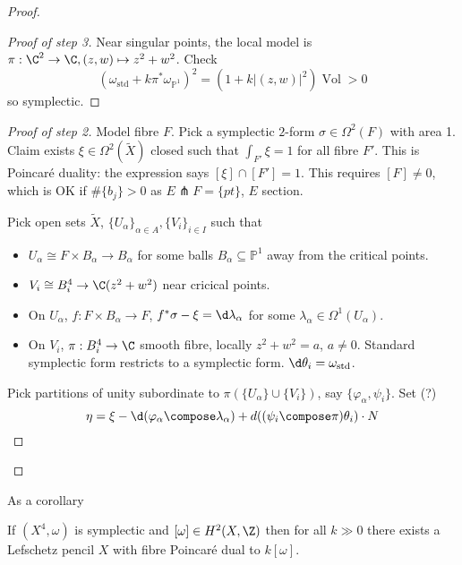 \documentclass[a4paper]{article}
\renewcommand*{\P}{\mathbb{P}}
\DeclareMathOperator{\Vol}{Vol} %
\begin{document}
\begin{proof}
\begin{proof}[Proof of step 3]
    Near singular points, the local model is \(\pi: \C^2 \to \C, (z, w) \mapsto z^2 + w^2\). Check
    \[
      (\omega_{\mathrm{std}} + k\pi^* \omega_{\P^1})^2 = (1 + k |(z, w)|^2) \Vol > 0
    \]
    so symplectic.
  \end{proof}

  \begin{proof}[Proof of step 2]
    Model fibre \(F\). Pick a symplectic \(2\)-form \(\sigma \in \Omega^2(F)\) with area 1. Claim exists \(\xi \in \Omega^2(\tilde X)\) closed such that \(\int_{F'} \xi = 1\) for all fibre \(F'\). This is Poincaré duality: the expression says \([\xi] \cap [F'] = 1\). This requires \([F] \ne 0\), which is OK if \(\#\{b_j\} > 0\) as \(E \pitchfork F = \{pt\}\), \(E\) section.

    Pick open sets \(\tilde X\), \(\{U_\alpha\}_{\alpha \in A}, \{V_i\}_{i \in I}\) such that
    \begin{itemize}
    \item \(U_\alpha \cong F \times B_\alpha \to B_\alpha\) for some balls \(B_\alpha \subseteq \P^1\) away from the critical points.
    \item \(V_i \cong B_i^4 \to \C (z^2 + w^2)\) near cricical points.
    \end{itemize}

    \begin{itemize}
    \item On \(U_\alpha\), \(f: F \times B_\alpha \to F\), \(f^*\sigma - \xi = \d \lambda_\alpha\) for some \(\lambda_\alpha \in \Omega^1(U_\alpha)\).
    \item On \(V_i\), \(\pi: B_i^4 \to \C\) smooth fibre, locally \(z^2 + w^2 = a\), \(a \ne 0\). Standard symplectic form restricts to a symplectic form. \(\d \theta_i = \omega_{\mathrm{std}}\).
    \end{itemize}

    Pick partitions of unity subordinate to \(\pi(\{U_\alpha\} \cup \{V_i\})\), say \(\{\varphi_\alpha, \psi_i\}\). Set (?)
    \[
      \eta = \xi - \d (\varphi_\alpha \compose \lambda_\alpha) + d ((\psi_i \compose \pi) \theta_i) \cdot N
    \]
  \end{proof}
\end{proof}

As a corollary

\begin{theorem}
  If \((X^4, \omega)\) is symplectic and \([\omega] \in H^2(X, \Z)\) then for all \(k \gg 0\) there exists a Lefschetz pencil \(X\) with fibre Poincaré dual to  \(k[\omega]\).
\end{theorem}
\end{document}
